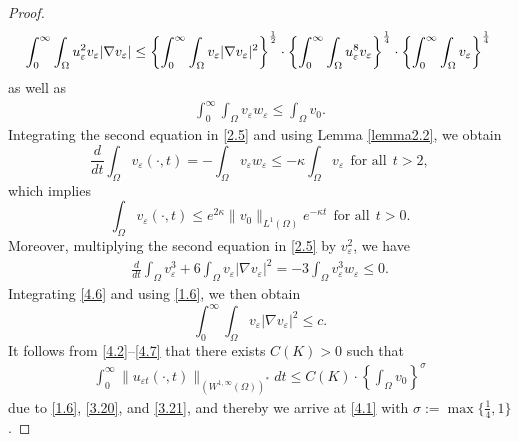 \documentclass[12pt]{article}
\theoremstyle{plain}
\theoremstyle{definition}
\numberwithin{equation}{section}
\begin{document}
\begin{proof}
\begin{equation}
     \int_0^{\infty}\int_{\Omega}u_{\varepsilon}^{2}v_{\varepsilon}|\nabla v_{\varepsilon}|
     \leq\left\{\int_0^{\infty}\int_{\Omega}v_{\varepsilon}|\nabla v_{\varepsilon}|^2\right\}^{\frac{1}{2}}\cdot \left\{\int_0^{\infty}\int_{\Omega}u_{\varepsilon}^{8}v_{\varepsilon} \right\}^{\frac{1}{4}}\cdot\left\{\int_0^{\infty}\int_{\Omega}v_{\varepsilon} \right\}^{\frac{1}{4}}\\
 \end{equation}
 as well as
 \begin{align}\label{4.5}
    \int_0^{\infty}\int_{\Omega}v_{\varepsilon}w_{\varepsilon}\leq\int_\Omega v_0.%
 \end{align}
 Integrating the second equation in \eqref{2.5} and using Lemma \ref{lemma2.2}, we obtain
 \begin{equation*}
 \frac{d}{dt}\int_\Omega v_\varepsilon(\cdot,t)=-\int_{\Omega}v_\varepsilon w_\varepsilon\leq-\kappa\int_\Omega v_\varepsilon~~\mbox{for all}~~t>2,
 \end{equation*}
 which implies
 \begin{equation}\label{4.6*}
 \int_\Omega v_\varepsilon(\cdot,t)\leq e^{2\kappa}\|v_0\|_{L^1(\Omega)}e^{-\kappa t}~~\mbox{for all}~~t>0.
 \end{equation}
 Moreover, multiplying the second equation in \eqref{2.5} by $v_{\varepsilon}^2$, we have
    \begin{align}\label{4.6}
    \frac{d}{dt}\int_{\Omega}v_{\varepsilon}^3+6\int_{\Omega}v_{\varepsilon}|\nabla
    v_{\varepsilon}|^2=-3\int_{\Omega}v_{\varepsilon}^3w_{\varepsilon}\leq 0.
\end{align}
Integrating \eqref{4.6} and using \eqref{1.6}, we then obtain \begin{equation}\label{4.7}\int_0^{\infty}\int_\Omega v_\varepsilon|\nabla v_\varepsilon|^2\leq c.
\end{equation}
 It follows from \eqref{4.2}--\eqref{4.7} that there exists $C(K)>0$ such that
 \begin{align*}
      \int_0^{\infty}\|u_{\varepsilon t}(\cdot,t)\|_{(W^{1,\infty}(\Omega))^*}dt\leq C(K)\cdot\left\{\int_\Omega v_{0}\right\}^{\sigma}
 \end{align*}
 due to \eqref{1.6}, \eqref{3.20}, and \eqref{3.21}, and thereby we arrive at \eqref{4.1} with $\sigma:=\max\{\frac{1}{4},1\}$.
\end{proof}
\end{document}
